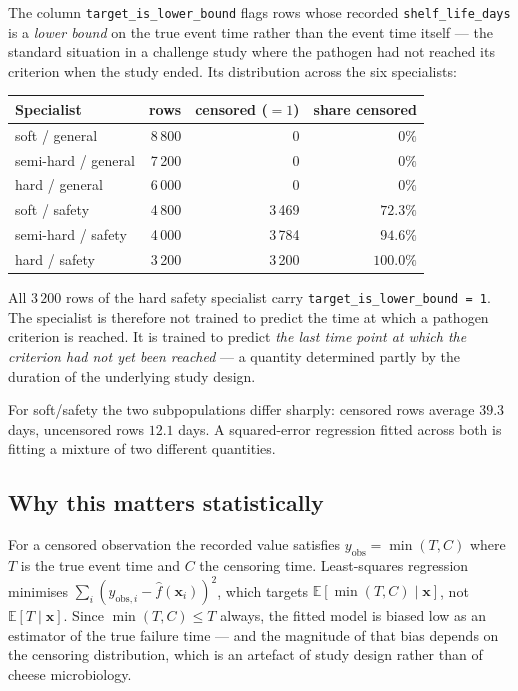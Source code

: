 The column \texttt{target\_is\_lower\_bound} flags rows whose recorded
\texttt{shelf\_life\_days} is a \emph{lower bound} on the true event time
rather than the event time itself --- the standard situation in a challenge
study where the pathogen had not reached its criterion when the study
ended. Its distribution across the six specialists:

\begin{center}\small
\begin{tabular}{lrrr}
\toprule
Specialist & rows & censored ($=1$) & share censored \\
\midrule
soft / general & 8\,800 & 0 & $0\%$ \\
semi-hard / general & 7\,200 & 0 & $0\%$ \\
hard / general & 6\,000 & 0 & $0\%$ \\
\addlinespace[2pt]
soft / safety & 4\,800 & 3\,469 & $72.3\%$ \\
semi-hard / safety & 4\,000 & 3\,784 & $94.6\%$ \\
hard / safety & 3\,200 & 3\,200 & $\mathbf{100.0\%}$ \\
\bottomrule
\end{tabular}
\end{center}

\begin{findingbox}[title={Every row of the hard/safety-endpoint specialist is right-censored}]
All $3\,200$ rows of the hard safety specialist carry
\texttt{target\_is\_lower\_bound = 1}. The specialist is therefore not
trained to predict the time at which a pathogen criterion is reached. It is
trained to predict \emph{the last time point at which the criterion had not
yet been reached} --- a quantity determined partly by the duration of the
underlying study design.

For soft/safety the two subpopulations differ sharply: censored rows
average $39.3$ days, uncensored rows $12.1$ days. A squared-error
regression fitted across both is fitting a mixture of two different
quantities.
\end{findingbox}

\subsection{Why this matters statistically}

For a censored observation the recorded value satisfies
$y_{\text{obs}} = \min(T, C)$ where $T$ is the true event time and $C$ the
censoring time. Least-squares regression minimises
$\sum_i (y_{\text{obs},i} - \hat{f}(\mathbf{x}_i))^2$, which targets
$\mathbb{E}[\min(T, C) \mid \mathbf{x}]$, not $\mathbb{E}[T \mid \mathbf{x}]$.
Since $\min(T,C) \le T$ always, the fitted model is biased low as an
estimator of the true failure time --- and the magnitude of that bias
depends on the censoring distribution, which is an artefact of study design
rather than of cheese microbiology.

